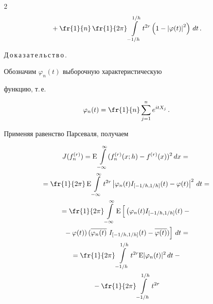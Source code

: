 \begin{multicols}{2}
\begin{multline}
{}+

\fr{1}{n}\,\fr{1}{2\pi}\int\limits_{-1/h}^{1/h}t^{2r}\left(1-

\left\vert\varphi(t)\right\vert^2\right)\,dt\,.

\label{e10-u1}

\end{multline}



\medskip



\noindent

Д\,о\,к\,а\,з\,а\,т\,е\,л\,ь\,с\,т\,в\,о\,.\ 

Обозначим $\varphi_n(t)$ выборочную характеристическую

функцию, т.\,е.\

$$

\varphi_n(t)=\fr{1}{n}\sum\limits_{j=1}^ne^{itX_j}\,.

$$

Применяя равенство Парсеваля, получаем

\begin{multline}

J(f_n^{(r)})={\rm E}\int\limits_{-\infty}^\infty(f_n^{(r)}(x;h)-f^{(r)}(x))^2\,dx={}\\

{}=

\fr{1}{2\pi}\,

{\rm E}\int\limits_{-\infty}^\infty

t^{2r}\left\vert\varphi_n(t)I_{[-1/h,1/h]}(t)-\varphi(t)\right\vert^2\,dt={}\\

{}=

\fr{1}{2\pi}\int\limits_{-\infty}^\infty

{\rm E}\left[

\vphantom{\overline{\varphi(t)}}

\left(\varphi_n(t)I_{[-1/h,1/h]}(t)-{}\right.\right.\\

\left.\left.{}-\varphi(t)\right)

(\overline{\varphi_n(t)}\ I_{[-1/h,1/h]}(t)-

\overline{\varphi(t)})\right]\,dt={}\\

{}=\fr{1}{2\pi}\int\limits_{-1/h}^{1/h} t^{2r}{\rm E}|\varphi_n(t)|^2\,dt-{}\\

{}-

\fr{1}{2\pi}\int\limits_{-1/h}^{1/h} t^{2r}


\end{multline}
\end{multicols}
